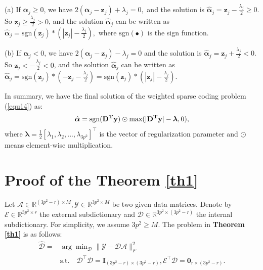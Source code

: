 (a) If $\bm{\alpha}_{j}\ge 0$, we have 
$
2(\bm{\alpha}_{j}-\mathbf{z}_{j})+\lambda_{j}=0,
$ and the solution is
$
\hat{\bm{\alpha}}_{j}=\mathbf{z}_{j}-\frac{\lambda_{j}}{2} \ge 0.
$
So $\mathbf{z}_{j}\ge\frac{\lambda_{j}}{2}> 0$, and the solution $\hat{\bm{\alpha}}_{j}$ can be written as
$
\hat{\bm{\alpha}}_{j}=\text{sgn}(\mathbf{z}_{j})*(|\mathbf{z}_{j}|-\frac{\lambda_{j}}{2}),
$
where $\text{sgn}(\bullet)$ is the sign function. 

(b) If $\bm{\alpha}_{j}< 0$, we have
$
2(\bm{\alpha}_{j}-\mathbf{z}_{j})-\lambda_{j}=0
$
and the solution is
$
\hat{\bm{\alpha}}_{j}=\mathbf{z}_{j}+\frac{\lambda_{j}}{2} < 0.
$
So $\mathbf{z}_{j}<-\frac{\lambda_{j}}{2}< 0$, and the solution $\hat{\bm{\alpha}}_{j}$ can be written as
$
\hat{\bm{\alpha}}_{j}=\text{sgn}(\mathbf{z}_{j})*(-\mathbf{z}_{j}-\frac{\lambda_{j}}{2})=\text{sgn}(\mathbf{z}_{j})*(|\mathbf{z}_{j}|-\frac{\lambda_{j}}{2}).
$

In summary, we have the final solution of the weighted sparse coding problem (\ref{equ14}) as:
\vspace{-1mm}
\begin{equation}\label{equ18}\vspace{-1mm}
\hat{\bm{\alpha}}= \text{sgn}(\mathbf{D^{T}y})\odot \text{max}(|\mathbf{D^{T}y}|-\bm{\lambda},0),
\end{equation}
where $\bm{\lambda} = \frac{1}{2}[\lambda_{1},\lambda_{2},...,\lambda_{3p^2}]^{\top}$ is the vector of regularization parameter and $\odot$ means element-wise multiplication.

\section{Proof of the Theorem \ref{th1}}

Let $\mathcal{A}\in \mathbb{R}^{(3p^2-r)\times M},\mathcal{Y}\in \mathbb{R}^{3p^2\times M}$ be two given data matrices. Denote by $\mathcal{E}\in\mathbb{R}^{3p^2\times r}$ the external subdictionary and $\mathcal{D}\in\mathbb{R}^{3p^2\times (3p^2-r)}$ the internal subdictionary. For simplicity, we assume $3p^2\ge M$. The problem in \textbf{Theorem \ref{th1}} is as follows:
\begin{equation}\label{equ19}
\begin{split}
\hat{\mathcal{D}}
=
&
\arg\min\nolimits_{\mathcal{D}}\|\mathcal{Y}-\mathcal{D}\mathcal{A}\|_{F}^{2}
\\
&
\text{s.t.}
\quad
\mathcal{D}^{\top}\mathcal{D} = \bm{I}_{(3p^2-r)\times (3p^2-r)}, \mathcal{E}^{\top}\mathcal{D} = \bm{0}_{r\times (3p^2-r)}.
\end{split}
\end{equation} 

